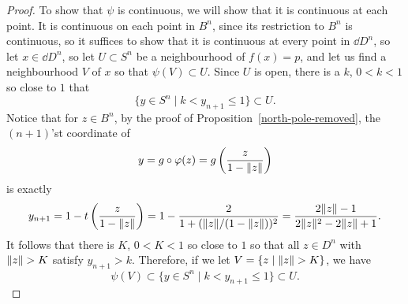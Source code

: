 \begin{proof}
  To show that $\psi$ is continuous, we will show that it is continuous at each point. It is continuous on each point in $B^n$, since its restriction to $B^n$ is continuous, so it suffices to show that it is continuous at every point in $\dd D^n$, so let $x \in \dd D^n$, so let $U \subset S^n$ be a neighbourhood of $f(x) = p$, and let us find a neighbourhood $V$ of $x$ so that $\psi(V) \subset U$. Since $U$ is open, there is a $k$, $0 < k < 1$ so close to $1$ that
  \[
    \{ y \in S^n \mid k < y_{n+1} \leq 1 \} \subset U.
  \]
  Notice that for $z \in B^n$, by the proof of Proposition~\ref{north-pole-removed}, the $(n+1)$'st coordinate of
  \[
    y = g \circ \varphi(z) = g\left(\frac{z}{1-\lVert z \rVert}\right)
  \]
  is exactly
  \[
    y_{n+1} = 1-t\left( \frac{z}{1-\lVert z \rVert} \right) = 1- \frac{2}{1+(\lVert z \rVert/(1-\lVert z \rVert))^2} = \frac{2\lVert z \rVert - 1 }{2\lVert z \rVert^2 - 2 \lVert z \rVert + 1}.
  \]
  It follows that there is $K$, $0 < K < 1$ so close to $1$ so that all $z \in D^n$ with $\lVert z \rVert > K$ satisfy $y_{n+1} > k$. Therefore, if we let $V = \{z \mid \lVert z \rVert > K\}$, we have
  \[
    \psi(V) \subset \{ y \in S^n \mid k < y_{n+1} \leq 1 \} \subset U.
  \]
\end{proof}
